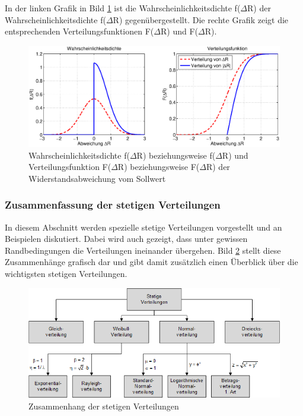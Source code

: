 \noindent In der linken Grafik in Bild \ref{fig:Stetig_Betragsverteilung1Art_Widerstandsfertigung1} ist die Wahrscheinlichkeitsdichte f($\Delta$R) der Wahrscheinlichkeitsdichte f({\textbar}$\Delta$R{\textbar}) gegen\"{u}bergestellt. Die rechte Grafik zeigt die entsprechenden Verteilungsfunktionen F($\Delta$R) und F({\textbar}$\Delta$R{\textbar}).

\begin{figure}[H]
  \centerline{\includegraphics[width=1\textwidth]{Kapitel4/Bilder/image41}}
  \caption{Wahrscheinlichkeitsdichte f($\Delta$R) beziehungsweise f({\textbar}$\Delta$R{\textbar}) und Verteilungsfunktion F($\Delta$R) beziehungsweise F({\textbar}$\Delta$R{\textbar}) der Widerstandsabweichung vom Sollwert}
  \label{fig:Stetig_Betragsverteilung1Art_Widerstandsfertigung1}
\end{figure}

\subsubsection{Zusammenfassung der stetigen Verteilungen}

\noindent In diesem Abschnitt werden spezielle stetige Verteilungen vorgestellt und an Beispielen diskutiert. Dabei wird auch gezeigt, dass unter gewissen Randbedingungen die Verteilungen ineinander \"{u}bergehen. Bild \ref{fig:Stetig_Betragsverteilung1Art_Widerstandsfertigung2} stellt diese Zusammenh\"{a}nge grafisch dar und gibt damit zus\"{a}tzlich einen \"{U}berblick \"{u}ber die wichtigsten stetigen Verteilungen.

\begin{figure}[H]
  \centerline{\includegraphics[width=1\textwidth]{Kapitel4/Bilder/image42}}
  \caption{Zusammenhang der stetigen Verteilungen}
  \label{fig:Stetig_Betragsverteilung1Art_Widerstandsfertigung2}
\end{figure}


